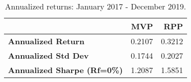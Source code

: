 \begin{table}[!htb]
    \centering
      \begingroup
      \fontsize{9}{9}
      \selectfont 
\begin{tabular}{>{}lrr}
\toprule
  & MVP & RPP\\
\midrule
\textbf{Annualized Return} & 0.2107 & 0.3212\\
\textbf{Annualized Std Dev} & 0.1744 & 0.2027\\
\textbf{Annualized Sharpe (Rf=0\%)} & 1.2087 & 1.5851\\
\bottomrule
\end{tabular} \caption{Annualized returns: January 2017 - December 2019.}
      \label{tab:RPP1}  %
      \endgroup{}
      \end{table}